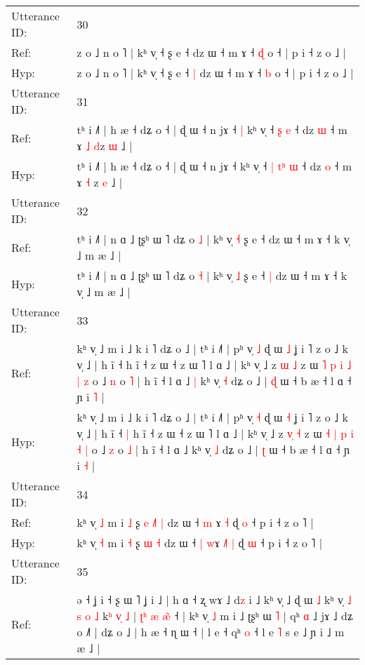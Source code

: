 \documentclass[10pt]{article}
\DeclareRobustCommand{\hl}[1]{{\textcolor{red}{#1}}}
\begin{document}
\begin{longtable}{ll}
 \\
\midrule
Utterance ID: & 30 \\
Ref: & z o ˩ n o ˥ | kʰ v̩ ˧ ʂ e ˧\hl{}\hl{} dz ɯ ˧ m ɤ ˧ \hl{ɖ} o ˧ | p i ˧ z o ˩ |
 \\
Hyp: & z o ˩ n o ˥ | kʰ v̩ ˧ ʂ e ˧\hl{ }\hl{|} dz ɯ ˧ m ɤ ˧ \hl{b} o ˧ | p i ˧ z o ˩ |
 \\
\midrule
Utterance ID: & 31 \\
Ref: & tʰ i ˩˥ | h æ ˧ dʑ o ˧ | ɖ ɯ ˧ n jɤ ˧\hl{ }\hl{|} kʰ v̩ ˧\hl{}\hl{} \hl{}\hl{ʂ} \hl{e} ˧ dz \hl{ɯ} ˧ m ɤ \hl{˩} \hl{d}z \hl{ɯ} ˩ |
 \\
Hyp: & tʰ i ˩˥ | h æ ˧ dʑ o ˧ | ɖ ɯ ˧ n jɤ ˧\hl{}\hl{} kʰ v̩ ˧\hl{ }\hl{|} \hl{t}\hl{ʰ} \hl{ɯ} ˧ dz \hl{o} ˧ m ɤ \hl{˧} \hl{}z \hl{e} ˩ |
 \\
\midrule
Utterance ID: & 32 \\
Ref: & tʰ i ˩˥ | n ɑ ˩ ʈʂʰ ɯ ˥ dʑ o \hl{˩} | kʰ v̩ \hl{˧} ʂ e ˧\hl{}\hl{} dz ɯ ˧ m ɤ ˧ k v̩ ˩ m æ ˩ |
 \\
Hyp: & tʰ i ˩˥ | n ɑ ˩ ʈʂʰ ɯ ˥ dʑ o \hl{˧} | kʰ v̩ \hl{˩} ʂ e ˧\hl{ }\hl{|} dz ɯ ˧ m ɤ ˧ k v̩ ˩ m æ ˩ |
 \\
\midrule
Utterance ID: & 33 \\
Ref: & kʰ v̩ ˩ m i ˩ k i ˥ dʑ o ˩ | tʰ i ˩˥ | pʰ v̩ \hl{˩} ɖ ɯ \hl{˩} ʝ i ˥ z o ˩ k v̩ ˩ | h ĩ ˧\hl{}\hl{} h ĩ ˧ z ɯ ˧ z ɯ ˥ l ɑ ˩ | kʰ v̩ ˩ z \hl{}\hl{ɯ} \hl{˩} z ɯ \hl{˥} \hl{p} \hl{i} \hl{˩} \hl{|} \hl{z} o ˩ \hl{n} o \hl{˥} | h ĩ ˧ l ɑ ˩\hl{ }\hl{|} kʰ v̩ \hl{˧} dʑ o ˩ | \hl{ɖ} ɯ ˧ b æ ˧ l ɑ ˧ ɲ i \hl{˥} |
 \\
Hyp: & kʰ v̩ ˩ m i ˩ k i ˥ dʑ o ˩ | tʰ i ˩˥ | pʰ v̩ \hl{˧} ɖ ɯ \hl{˧} ʝ i ˥ z o ˩ k v̩ ˩ | h ĩ ˧\hl{ }\hl{|} h ĩ ˧ z ɯ ˧ z ɯ ˥ l ɑ ˩ | kʰ v̩ ˩ z \hl{v}\hl{̩} \hl{˧} z ɯ \hl{˧} \hl{|} \hl{p} \hl{i} \hl{˧} \hl{|} o ˩ \hl{z} o \hl{˩} | h ĩ ˧ l ɑ ˩\hl{}\hl{} kʰ v̩ \hl{˩} dʑ o ˩ | \hl{ʈ} ɯ ˧ b æ ˧ l ɑ ˧ ɲ i \hl{˧} |
 \\
\midrule
Utterance ID: & 34 \\
Ref: & kʰ v̩ \hl{˩} m i \hl{˩} ʂ\hl{ }\hl{e} \hl{˩}\hl{˥} \hl{|} dz ɯ ˧ \hl{m} \hl{}ɤ\hl{}\hl{}\hl{} \hl{˧} ɖ \hl{o} ˧ p i ˧ z o ˥ |
 \\
Hyp: & kʰ v̩ \hl{˧} m i \hl{˧} ʂ\hl{}\hl{} \hl{}\hl{ɯ} \hl{˧} dz ɯ ˧ \hl{|} \hl{w}ɤ\hl{ }\hl{˩}\hl{˥} \hl{|} ɖ \hl{ɯ} ˧ p i ˧ z o ˥ |
 \\
\midrule
Utterance ID: & 35 \\
Ref: & ə ˧ ʝ i ˧ ʂ ɯ ˥ ʝ i ˩ | h ɑ ˧ ʐ wɤ ˩\hl{}\hl{} d\hl{z} i ˩ kʰ v̩ ˩\hl{}\hl{} ɖ ɯ \hl{˩} kʰ v̩ \hl{˩} \hl{s} \hl{o} \hl{˩} k\hl{ʰ} \hl{v}\hl{̩} \hl{}\hl{˩} | \hl{}\hl{ʈ}\hl{ʰ} \hl{æ} \hl{}\hl{æ}\hl{̃} ˧ | kʰ v̩ \hl{˩} m i ˩ ʈʂʰ ɯ \hl{˥} | qʰ \hl{}\hl{ɑ} ˩ jɤ ˩ dʑ o ˩˥ | dʑ o ˩ | h æ\hl{} ˧ ɳ ɯ ˧ | l e ˧ qʰ \hl{}\hl{o} ˧ l e \hl{˥} s e ˩ ɲ i ˩ m æ ˩ |

\end{longtable}
\end{document}
